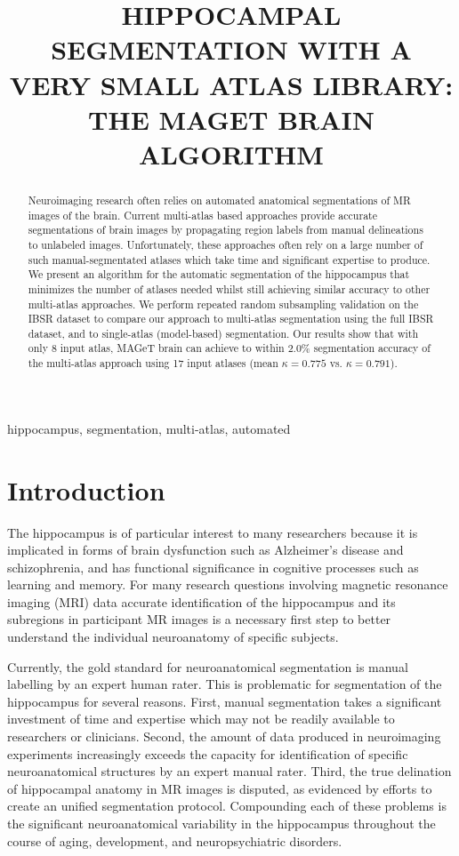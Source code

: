 \documentclass{article}
\title{HIPPOCAMPAL SEGMENTATION WITH A VERY SMALL ATLAS LIBRARY: THE MAGET
BRAIN ALGORITHM}
\newcommand{\magetbrain}{MAGeT brain }
\begin{document}

\maketitle       

\begin{abstract}
Neuroimaging research often relies on automated anatomical segmentations of MR
images of the brain. Current multi-atlas based approaches provide accurate
segmentations of brain images by propagating region labels from manual
delineations to unlabeled images. Unfortunately, these approaches often rely on
a large number of such manual-segmentated atlases which take time and
significant expertise to produce. We present an algorithm for the automatic
segmentation of the hippocampus that minimizes the number of atlases needed
whilst still achieving similar accuracy to  other multi-atlas approaches.  We
perform repeated random subsampling validation on the IBSR dataset to compare
our approach to multi-atlas segmentation using the full IBSR dataset, and to
single-atlas (model-based) segmentation. Our results show that with only 8
input atlas, \magetbrain can achieve to within 2.0\% segmentation accuracy of
the multi-atlas approach using 17 input atlases (mean $\kappa = 0.775$ vs.
$\kappa = 0.791$).

\end{abstract}

\begin{keywords}
hippocampus, segmentation, multi-atlas, automated
\end{keywords}

\section{Introduction}
\label{sec:intro}

The hippocampus is of particular interest to many researchers because it is
implicated in forms of brain dysfunction such as Alzheimer's disease and
schizophrenia, and has functional significance in cognitive processes such as
learning and memory.  For many research questions involving magnetic resonance
imaging (MRI) data accurate identification of the hippocampus and its
subregions in participant MR images is a necessary first step to better
understand the individual neuroanatomy of specific subjects.  

Currently, the gold standard for neuroanatomical segmentation is manual
labelling by an expert human rater.  This is problematic for segmentation of
the hippocampus for several reasons.  First, manual segmentation takes a
significant investment of time and expertise \cite{Hammers2003} which may not
be readily available to researchers or clinicians.  Second, the amount of data
produced in neuroimaging experiments increasingly exceeds the capacity for
identification of specific neuroanatomical structures by an expert manual
rater.  Third, the true delination of hippocampal anatomy in MR images is
disputed\cite{Geuze2004}, as evidenced by efforts to create an unified
segmentation protocol\cite{Jack2011}.  Compounding each of these problems
is the significant neuroanatomical variability in the hippocampus
throughout the course of aging, development, and neuropsychiatric
disorders\cite{someone}.
\end{document}
